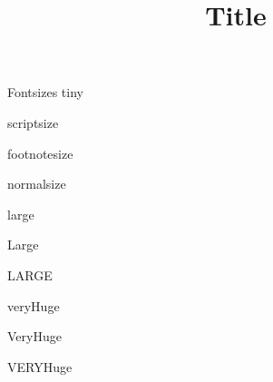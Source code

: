 \documentclass[final]{beamer} %
\title[]{Title}
\author[]{}
\institute[]{}
\date{}
\begin{document}
\begin{frame}{}
\maketitle 
\vfill
\begin{block}{\large Fontsizes}
  \centering
  {\tiny tiny}\par
  {\scriptsize scriptsize}\par
  {\footnotesize footnotesize}\par
  {\normalsize normalsize}\par
  {\large large}\par
  {\Large Large}\par
  {\LARGE LARGE}\par
  {\veryHuge veryHuge}\par
  {\VeryHuge VeryHuge}\par
  {\VERYHuge VERYHuge}\par
\end{block}
\vfill
\end{frame}
\end{document}
